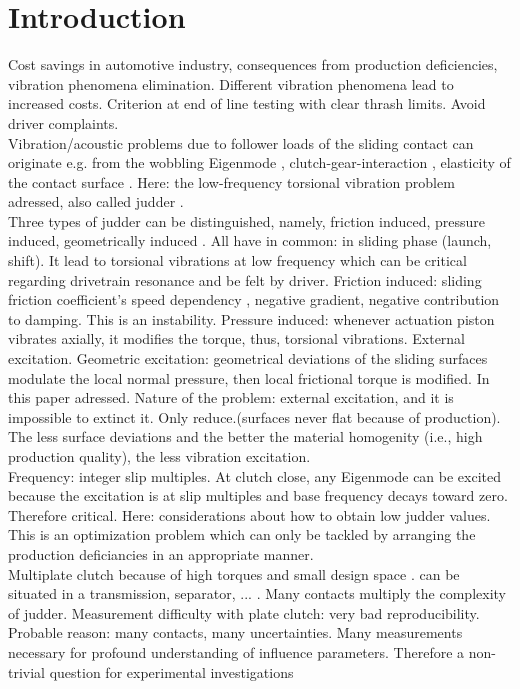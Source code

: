 \documentclass[a4paper,fleqn]{cas-dc}
\begin{document}
\section{Introduction}
Cost savings in automotive industry, consequences from production deficiencies, vibration phenomena elimination. Different vibration phenomena lead to increased costs. Criterion at end of line testing with clear thrash limits. Avoid driver complaints. \\
Vibration/acoustic problems due to follower loads of the sliding contact can originate e.g. from the wobbling Eigenmode \cite{fidlin2011minimal,wickramarachi2005analysis}, clutch-gear-interaction \cite{jehle2018nonlinear}, elasticity of the contact surface \cite{hetzler2009moving,jehle2016flexible}. Here: the low-frequency torsional vibration problem adressed, also called judder \cite{klement2011Fahrzeug}.\\
Three types of judder can be distinguished, namely, friction induced, pressure induced, geometrically induced \cite{drexl1990clutch}. All have in common: in sliding phase (launch, shift). It lead to torsional vibrations at low frequency which can be critical regarding drivetrain resonance and be felt by driver. 
Friction induced: sliding friction coefficient's speed dependency \cite{hinrichs1997reibungsschwingungen,kauderer1958nichtlineare}, negative gradient, negative contribution to damping. This is an instability. Pressure induced: whenever actuation piston vibrates axially, it modifies the torque, thus, torsional vibrations. External excitation. 
Geometric excitation: geometrical deviations of the sliding surfaces modulate the local normal pressure, then local frictional torque is modified. In this paper adressed. Nature of the problem: external excitation, and it is impossible to extinct it. Only reduce.(surfaces never flat because of production). The less surface deviations and the better the material homogenity (i.e., high production quality), the less vibration excitation. \\
Frequency: integer slip multiples. At clutch close, any Eigenmode can be excited because the excitation is at slip multiples and base frequency decays toward zero. Therefore critical. Here: considerations about how to obtain low judder values. This is an optimization problem \cite{albers1998Rupfen,dresig2014schwingungen,hausner2012Judder} which can only be tackled by arranging the production deficiancies in an appropriate manner. \\
Multiplate clutch because of high torques and small design space \cite{klement2011Fahrzeug}. can be situated in a transmission, separator, ... . Many contacts multiply the complexity of judder. Measurement difficulty with plate clutch: very bad reproducibility. Probable reason: many contacts, many uncertainties. Many measurements necessary for profound understanding of influence parameters. Therefore a non-trivial question for experimental investigations \cite{ingram2010Clutch} \\
\end{document}
